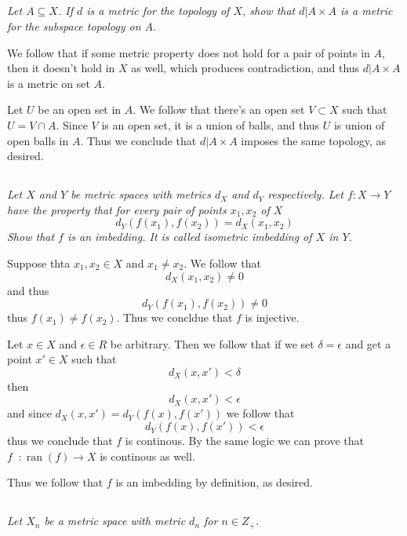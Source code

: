 \documentclass[11pt,oneside,titlepage]{book}
\DeclareMathOperator \inv {^{-1}}
\DeclareMathOperator \ran {ran}
\begin{document}
\subsection{}

\textit{Let $A \subseteq X$. If $d$ is a metric for the topology of $X$, show that $d|A \times A$
  is a metric for the subspace topology on $A$.}

We follow that if some metric property does not hold for a pair of points in $A$, then
it doesn't hold in $X$ as well, which produces contradiction, and thus $d|A \times A$ is
a metric on set $A$.

Let $U$ be an open set in $A$. We follow that there's an open set $V \subset X$
such that $U = V \cap A$. Since $V$ is an open set, it is a union of balls, and thus
$U$ is union of open balls in $A$. Thus we conclude that $d|A \times A$ imposes the same topology,
as desired.

\subsection{}

\textit{Let $X$ and $Y$ be metric spaces with metrics $d_X$ and $d_Y$ respectively. Let
  $f: X \to Y$ have the property that for every pair of points $x_1, x_2$ of $X$
  $$d_Y(f(x_1), f(x_2)) = d_X(x_1, x_2)$$
  Show that $f$ is an imbedding. It is called isometric imbedding of $X$ in $Y$.}

Suppose thta $x_1, x_2 \in X$ and $x_1 \neq x_2$. We follow that
$$d_X(x_1, x_2) \neq 0$$
and thus
$$d_Y(f(x_1), f(x_2)) \neq 0$$
thus $f(x_1) \neq f(x_2)$. Thus we concldue that $f$ is injective.

Let $x \in X$ and $\epsilon \in R$ be arbitrary. Then we follow that if we set $\delta = \epsilon$
and get a point $x' \in X$ such that
$$d_X(x, x') < \delta$$
then
$$d_X(x, x') < \epsilon$$
and since $d_X(x, x') = d_Y(f(x), f(x'))$ we follow that
$$d_Y(f(x), f(x')) < \epsilon$$
thus we conclude that $f$ is continous. By the same logic we can prove that $f\inv: \ran(f) \to X$
is continous as well.

Thus we follow that $f$ is an imbedding by definition, as desired.

\subsection{}

\textit{Let $X_n$ be a metric space with metric $d_n$ for $n \in Z_+$.}
\end{document}

